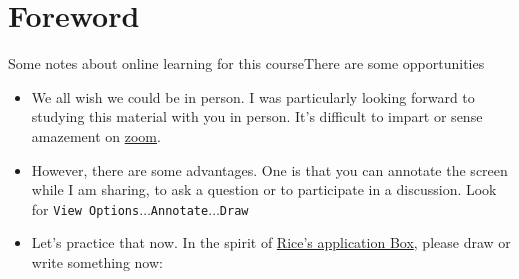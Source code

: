 
\section{Foreword}

\begin{frame}{Some notes about online learning for this course}{There are some opportunities}

\Vskip{-3.5em}\begin{itemize}
    \item We all wish we could be in person.  I was particularly looking forward to studying this material with you in person.  It's difficult to impart or sense amazement on \href{https://en.wikipedia.org/wiki/Zoom_Video_Communications}{zoom}.
    \item However, there are some advantages.  One is that you can annotate the screen while I am sharing, to ask a question or to participate in a discussion.  Look for \texttt{View Options}$\ldots$\texttt{Annotate}$\ldots$\texttt{Draw}
    \item Let's practice that now.  In the spirit of \href{https://admission.rice.edu/blog/in-the-know/your-application-checklist}{Rice's application Box}, please draw or write something  now:
\end{itemize}
    
\end{frame}

